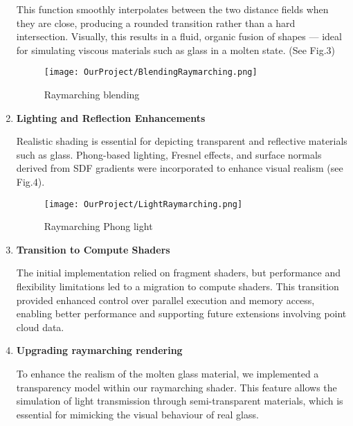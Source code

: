 \documentclass{rapportcs}
\begin{document}
\begin{enumerate}
        \newpage

        \noindent This function smoothly interpolates between the two distance fields when they are close, producing a rounded transition rather than a hard intersection. Visually, this results in a fluid, organic fusion of shapes — ideal for simulating viscous materials such as glass in a molten state. (See Fig.3)\\
    
        \begin{figure}[H]
            \centering
            \texttt{[image: OurProject/BlendingRaymarching.png]}
            \caption{Raymarching blending}
            \label{fig:label_image}
        \end{figure}
    
      \newpage

        
      \item \textbf{Lighting and Reflection Enhancements}
      
        Realistic shading is essential for depicting transparent and reflective materials such as glass.
        Phong-based lighting, Fresnel effects, and surface normals derived from SDF gradients were incorporated to enhance visual realism (see Fig.4).\\
    
        \begin{figure}[H]
            \centering
            \texttt{[image: OurProject/LightRaymarching.png]}
            \caption{Raymarching Phong light}
            \label{fig:label_image}
        \end{figure}
    
      \item \textbf{Transition to Compute Shaders}
        
        The initial implementation relied on fragment shaders, but performance and flexibility limitations led to a migration to compute shaders.
        This transition provided enhanced control over parallel execution and memory access, enabling better performance and supporting future extensions involving point cloud data.\\

        \newpage


      \item \textbf{Upgrading raymarching rendering}

        To enhance the realism of the molten glass material, we implemented a transparency model within our raymarching shader. This feature allows the simulation of light transmission through semi-transparent materials, which is essential for mimicking the visual behaviour of real glass.\\


\end{enumerate}
\end{document}
